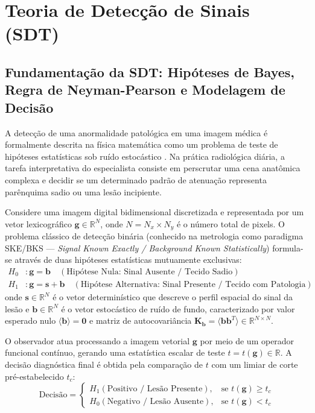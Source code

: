 \documentclass[
  12pt,
  a4paper,
  oneside
]{report}
\begin{document}
\section{Teoria de Detecção de Sinais (SDT)}
\label{sec:sdt_teoria_completa}

\subsection{Fundamentação da SDT: Hipóteses de Bayes, Regra de Neyman-Pearson e Modelagem de Decisão}
\label{subsec:sdt_fundamentacao_bayes_neyman}
A detecção de uma anormalidade patológica em uma imagem médica é formalmente descrita na física matemática como um problema de teste de hipóteses estatísticas sob ruído estocástico \cite{peterson1954, lusted1968, metz1986}. Na prática radiológica diária, a tarefa interpretativa do especialista consiste em perscrutar uma cena anatômica complexa e decidir se um determinado padrão de atenuação representa parênquima sadio ou uma lesão incipiente.

Considere uma imagem digital bidimensional discretizada e representada por um vetor lexicográfico $\mathbf{g} \in \mathbb{R}^N$, onde $N = N_x \times N_y$ é o número total de pixels. O problema clássico de detecção binária (conhecido na metrologia como paradigma SKE/BKS --- \emph{Signal Known Exactly / Background Known Statistically}) formula-se através de duas hipóteses estatísticas mutuamente exclusivas:
\begin{align}
  H_0 &: \mathbf{g} = \mathbf{b} \quad (\text{Hipótese Nula: Sinal Ausente / Tecido Sadio}) \label{eq:h0_def} \\
  H_1 &: \mathbf{g} = \mathbf{s} + \mathbf{b} \quad (\text{Hipótese Alternativa: Sinal Presente / Tecido com Patologia}) \label{eq:h1_def}
\end{align}
onde $\mathbf{s} \in \mathbb{R}^N$ é o vetor determinístico que descreve o perfil espacial do sinal da lesão e $\mathbf{b} \in \mathbb{R}^N$ é o vetor estocástico de ruído de fundo, caracterizado por valor esperado nulo $\langle \mathbf{b} \rangle = \mathbf{0}$ e matriz de autocovariância $\mathbf{K}_{\mathbf{b}} = \langle \mathbf{b} \mathbf{b}^T \rangle \in \mathbb{R}^{N \times N}$.

O observador atua processando a imagem vetorial $\mathbf{g}$ por meio de um operador funcional contínuo, gerando uma estatística escalar de teste $t = t(\mathbf{g}) \in \mathbb{R}$. A decisão diagnóstica final é obtida pela comparação de $t$ com um limiar de corte pré-estabelecido $t_c$:
\begin{equation}
  \text{Decisão} = \begin{cases}
    H_1 (\text{Positivo / Lesão Presente}), & \text{se } t(\mathbf{g}) \ge t_c \\
    H_0 (\text{Negativo / Lesão Ausente}), & \text{se } t(\mathbf{g}) < t_c
  \end{cases}
  \label{eq:regra_decisao_sdt}
\end{equation}
\end{document}
